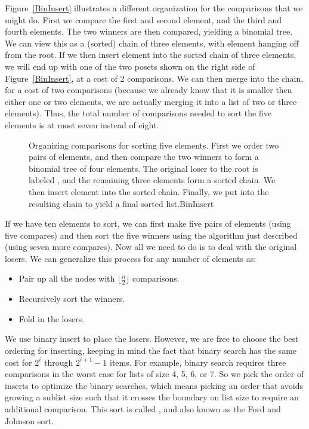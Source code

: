 Figure~\ref{BinInsert} illustrates a different organization for the
comparisons that we might do.
First we compare the first and second element, and the third and
fourth elements.
The two winners are then compared, yielding a binomial tree.
We can view this as a (sorted) chain of three elements, with element
 hanging off from the root.
If we then insert element  into the sorted chain of three
elements, we will end up with one of the two posets shown on the right
side of Figure~\ref{BinInsert}, at a cost of 2 comparisons.
We can then merge  into the chain, for a cost of two
comparisons (because we already know that it is smaller then either one
or two elements, we are actually merging it into a list of two or
three elements).
Thus, the total number of comparisons needed to sort the five elements
is at most seven instead of eight.

\begin{figure}
\medskip

{Organizing comparisons for sorting five elements.
First we order two pairs of elements, and then compare the two winners
to form a binomial tree of four elements.
The original loser to the root is labeled , and the remaining
three elements form a sorted chain.
We then insert element  into the sorted chain.
Finally, we put  into the resulting chain
to yield a final sorted list.}{BinInsert}
\bigskip
\end{figure}

If we have ten elements to sort, we can first make five pairs of
elements (using five compares) and then sort the five winners
using the algorithm just described (using seven more compares).
Now all we need to do is to deal with the original losers.
We can generalize this process for any number of elements as:

\begin{itemize}
\item Pair up all the nodes with $\lfloor \frac{n}{2} \rfloor$
comparisons.
\item Recursively sort the winners.
\item Fold in the losers.
\end{itemize}

We use binary insert to place the losers.
However, we are free to choose the best ordering for inserting,
keeping in mind the fact that binary search has the same cost for
\(2^i\) through \(2^{i+1} -1\) items.
For example, binary search requires three comparisons in the worst
case for lists of size 4, 5, 6, or 7.
So we pick the order of inserts to optimize the binary searches, which
means picking an order that avoids growing a sublist size such that it
crosses the boundary on list size to require an additional comparison.
This sort is called , and also known as the
Ford and Johnson sort.

